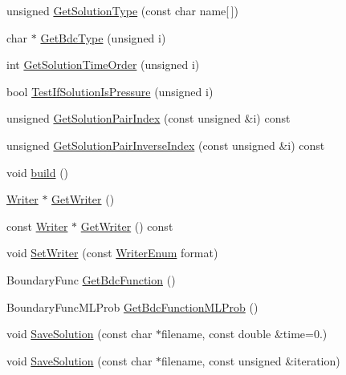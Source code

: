 \begin{DoxyCompactItemize}
unsigned \mbox{\hyperlink{classfemus_1_1_multi_level_solution_a47d5ef26d0cfa11d7eedcf01cce591a6}{Get\+Solution\+Type}} (const char name\mbox{[}$\,$\mbox{]})
\item 
char $\ast$ \mbox{\hyperlink{classfemus_1_1_multi_level_solution_a7c23e5c2e857d76f8c462814fde57b7e}{Get\+Bdc\+Type}} (unsigned i)
\item 
int \mbox{\hyperlink{classfemus_1_1_multi_level_solution_a4147ec5f7477689c0c1247f7b5fee0d1}{Get\+Solution\+Time\+Order}} (unsigned i)
\item 
bool \mbox{\hyperlink{classfemus_1_1_multi_level_solution_a05e5e6a460e0935f50e33b4d077a7bb7}{Test\+If\+Solution\+Is\+Pressure}} (unsigned i)
\item 
unsigned \mbox{\hyperlink{classfemus_1_1_multi_level_solution_a9075cb433163413c4281cc7258a84a7e}{Get\+Solution\+Pair\+Index}} (const unsigned \&i) const
\item 
unsigned \mbox{\hyperlink{classfemus_1_1_multi_level_solution_afed625007506f25cc3ab540965d78c86}{Get\+Solution\+Pair\+Inverse\+Index}} (const unsigned \&i) const
\item 
void \mbox{\hyperlink{classfemus_1_1_multi_level_solution_a7d6865114da00ad92090d916217cad3d}{build}} ()
\item 
\mbox{\hyperlink{classfemus_1_1_writer}{Writer}} $\ast$ \mbox{\hyperlink{classfemus_1_1_multi_level_solution_a231740aeb542389671b771902bfeeb34}{Get\+Writer}} ()
\item 
const \mbox{\hyperlink{classfemus_1_1_writer}{Writer}} $\ast$ \mbox{\hyperlink{classfemus_1_1_multi_level_solution_a775f0e2e4d2b3d55fcaa7f1936f91cf3}{Get\+Writer}} () const
\item 
void \mbox{\hyperlink{classfemus_1_1_multi_level_solution_ab21db6d274c28e64f6901925878a6f1a}{Set\+Writer}} (const \mbox{\hyperlink{_writer_enum_8hpp_a18b827c3c1f62b8a57febdcad0c871a8}{Writer\+Enum}} format)
\item 
Boundary\+Func \mbox{\hyperlink{classfemus_1_1_multi_level_solution_a608732141319d880851214a93c874d25}{Get\+Bdc\+Function}} ()
\item 
Boundary\+Func\+M\+L\+Prob \mbox{\hyperlink{classfemus_1_1_multi_level_solution_a529322b37ffbddcf71a3e4ddea60950d}{Get\+Bdc\+Function\+M\+L\+Prob}} ()
\item 
void \mbox{\hyperlink{classfemus_1_1_multi_level_solution_a98ee5705ff2d2406ff0f535ef14c96da}{Save\+Solution}} (const char $\ast$filename, const double \&time=0.)
\item 
void \mbox{\hyperlink{classfemus_1_1_multi_level_solution_a3844d272681081d0f75a5203cd09a1bc}{Save\+Solution}} (const char $\ast$filename, const unsigned \&iteration)

\end{DoxyCompactItemize}
